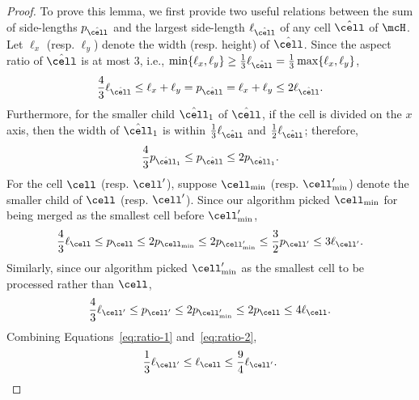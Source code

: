  
\ratio*
%
%
%
%
%
%
%
%
%
%
%
%
\begin{proof}
    To prove this lemma, we first provide two useful relations between the sum of side-lengths $p_{\hat{\cell}}$ and the largest side-length $\ell_{\hat{\cell}}$ of any cell $\hat{\cell}$ of $\mcH$. Let $\ell_x$ (resp. $\ell_y$) denote the width (resp. height) of $\hat\cell$. Since the aspect ratio of $\hat{\cell}$ is at most $3$, i.e., $\min\{\ell_x, \ell_y\} \ge \frac{1}{3}\ell_{\hat{\cell}} = \frac{1}{3}\max\{\ell_x, \ell_y\}$, 
    \begin{equation*}\label{eq:ratio-edge}
        \frac{4}{3}\ell_{\hat{\cell}} \le \ell_x + \ell_y = p_{\hat{\cell}} =\ell_x + \ell_y \le 2\ell_{\hat{\cell}}.
    \end{equation*}
    Furthermore, for the smaller child $\hat{\cell}_1$ of $\hat{\cell}$, if the cell is divided on the $x$ axis, then the width of $\hat{\cell}_1$ is within  $\frac{1}{3}\ell_{\hat\cell}$ and $\frac{1}{2}\ell_{\hat\cell}$; therefore,
    \begin{equation*}
        \frac{4}{3}p_{\hat{\cell}_1}\le p_{\hat\cell} \le 2 p_{\hat{\cell}_1}.
    \end{equation*}
    For the cell $\cell$ (resp. $\cell'$), suppose $\cell_{\min}$ (resp. $\cell'_{\min}$) denote the smaller child of $\cell$ (resp. $\cell'$). Since our algorithm picked $\cell_{\min}$ for being merged as the smallest cell before $\cell'_{\min}$, 
    \begin{equation}\label{eq:ratio-1}
        \frac{4}{3}\ell_\cell\le p_\cell\le 2p_{\cell_{\min}}\le 2p_{\cell'_{\min}}\le \frac{3}{2}p_{\cell'}\le 3\ell_{\cell'}.
    \end{equation}
    Similarly, since our algorithm picked $\cell'_{\min}$ as the smallest cell to be processed rather than $\cell$,
    \begin{equation}\label{eq:ratio-2}
        \frac{4}{3}\ell_{\cell'}\le p_{\cell'}\le 2p_{\cell'_{\min}}\le 2p_{\cell}\le 4\ell_\cell.
    \end{equation}
    Combining Equations~\eqref{eq:ratio-1} and~\eqref{eq:ratio-2},
    \begin{equation*}
        \frac{1}{3} \ell_{\cell'} \le \ell_\cell \le \frac{9}{4} \ell_{\cell'}.
    \end{equation*}
\end{proof}

%



